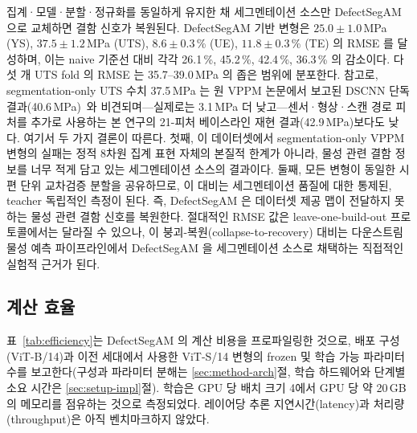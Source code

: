 집계·모델·분할·정규화를 동일하게 유지한 채 세그멘테이션 소스만
DefectSegAM 으로 교체하면 결함 신호가 복원된다. DefectSegAM 기반 변형은
$25.0 \pm 1.0$\,MPa (YS), $37.5 \pm 1.2$\,MPa (UTS), $8.6 \pm 0.3$\,\%
(UE), $11.8 \pm 0.3$\,\% (TE) 의 RMSE 를 달성하며, 이는 naive 기준선 대비
각각 26.1\,\%, 45.2\,\%, 42.4\,\%, 36.3\,\% 의 감소이다. 다섯 개 UTS fold
의 RMSE 는 35.7--39.0\,MPa 의 좁은 범위에 분포한다. 참고로,
segmentation-only UTS 수치 37.5\,MPa 는 원 VPPM 논문에서 보고된 DSCNN 단독
결과(40.6\,MPa)~\cite{VPPM_Baseline}와 비견되며---실제로는 3.1\,MPa 더
낮고---센서·형상·스캔 경로 피처를 추가로 사용하는 본 연구의 21-피처
베이스라인 재현 결과(42.9\,MPa)보다도 낮다. 여기서 두 가지 결론이 따른다.
첫째, 이 데이터셋에서 segmentation-only VPPM 변형의 실패는 정적 8차원 집계
표현 자체의 본질적 한계가 아니라, 물성 관련 결함 정보를 너무 적게 담고
있는 세그멘테이션 소스의 결과이다. 둘째, 모든 변형이 동일한 시편 단위
교차검증 분할을 공유하므로, 이 대비는 세그멘테이션 품질에 대한 통제된,
teacher 독립적인 측정이 된다. 즉, DefectSegAM 은 데이터셋 제공 맵이
전달하지 못하는 물성 관련 결함 신호를 복원한다. 절대적인 RMSE 값은
leave-one-build-out 프로토콜에서는 달라질 수 있으나, 이
붕괴-복원(collapse-to-recovery) 대비는 다운스트림 물성 예측 파이프라인에서
DefectSegAM 을 세그멘테이션 소스로 채택하는 직접적인 실험적 근거가 된다.

\subsection{계산 효율}
\label{sec:results-efficiency}

표~\ref{tab:efficiency}는 DefectSegAM 의 계산 비용을 프로파일링한 것으로,
배포 구성(ViT-B/14)과 이전 세대에서 사용한 ViT-S/14 변형의 frozen 및
학습 가능 파라미터 수를 보고한다(구성과 파라미터 분해는
\ref{sec:method-arch}절, 학습 하드웨어와 단계별 소요 시간은
\ref{sec:setup-impl}절). 학습은 GPU 당 배치 크기 4에서 GPU 당 약
20\,GB 의 메모리를 점유하는 것으로 측정되었다. 레이어당 추론
지연시간(latency)과 처리량(throughput)은 아직 벤치마크하지 않았다.

